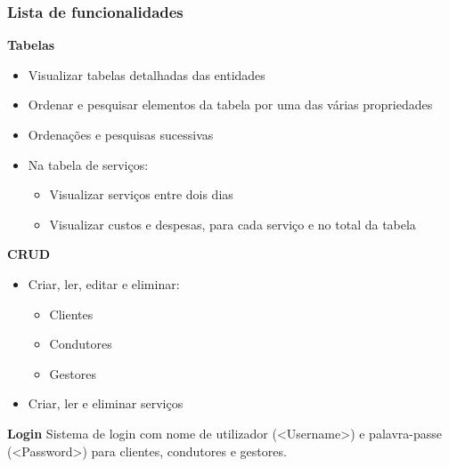 \documentclass{beamer}
\def\texttt#1{<#1>}
\begin{document}
\begin{frame}
\frametitle{Lista de funcionalidades}
\textbf{Tabelas}
\begin{itemize}
	\item Visualizar tabelas detalhadas das entidades
	\item Ordenar e pesquisar elementos da tabela por uma das várias propriedades
	\item Ordenações e pesquisas sucessivas
	\item Na tabela de serviços:
	\begin{itemize}
		\item Visualizar serviços entre dois dias
		\item Visualizar custos e despesas, para cada serviço e no total da tabela
	\end{itemize} 
\end{itemize}
\textbf{CRUD}
\begin{itemize}
	\item Criar, ler, editar e eliminar:
	\begin{itemize}
		\item Clientes
		\item Condutores
		\item Gestores
	\end{itemize}
	\item Criar, ler e eliminar serviços
\end{itemize}
\textbf{Login}
Sistema de login com nome de utilizador (\texttt{Username}) e palavra-passe (\texttt{Password}) para clientes, condutores e gestores.
\end{frame}
\end{document}
